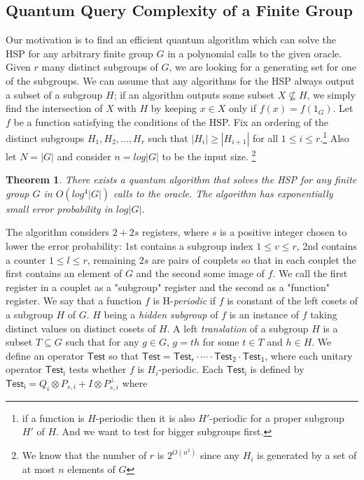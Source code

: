 \documentclass[12pt]{article}
\theoremstyle{plain}
\newtheorem{thm}{Theorem} %
\theoremstyle{definition}
\begin{document}
\subsection{Quantum Query Complexity of a Finite Group}
Our motivation is to find an efficient quantum algorithm which can solve the HSP for any arbitrary finite group $G$ in a polynomial calls to the given oracle. Given $r$ many distinct subgroups of $G$, we are looking for a generating set for one of the subgroups. We can assume that any algorithms for the HSP always output a subset of a subgroup $H$; if an algorithm outputs some subset $X\nsubseteq H$, we simply find the intersection of $X$ with $H$ by keeping $x\in X$ only if $f(x)=f(1_G)$.
\newline
Let $f$ be a function satisfying the conditions of the HSP. Fix an ordering of the distinct subgroups $H_1,H_2,\ldots,H_r$ such that $|H_{i}|\geq|H_{i+1}|$ for all $1\leq i \leq r$.\footnote{
if a function is $H$-periodic then it is also $H'$-periodic for a proper subgroup $H'$ of $H$. And we want to test for bigger subgroups first.}
Also let $N=|G|$ and consider $n=log|G|$ to be the input size. 
\footnote{
We know that the number of $r$ is $2^{O(n^2)}$ since any $H_i$ is generated by a set of at most $n$ elements of $G$}
\begin{thm}\label{thm3}
There exists a quantum algorithm that solves the HSP for any finite group $G$ in $O(log^4|G|)$ calls to the oracle. The algorithm has exponentially small error probability in $log|G|$.
\end{thm}
\noindent The algorithm considers $2+2s$ registers, where $s$ is a positive integer chosen to lower the error probability: 1st contains a subgroup index $1\leq v \leq r$, 2nd contains a counter $1\leq l \leq r$, remaining $2s$ are pairs of couplets so that in each couplet the first contains an element of $G$ and the second some image of $f$. We call the first register in a couplet as a "subgroup" register and the second as a "function" register.
\newline
We say that a function $f$ is H-\emph{periodic} if $f$ is constant of the left cosets of a subgroup $H$ of $G$. $H$ being a \emph{hidden subgroup} of $f$ is an instance of $f$ taking distinct values on distinct cosets of $H$.
\newline
A left \emph{translation} of a subgroup $H$ is a subset $T\subseteq G$ such that for any $g\in G$, $g=th$ for some $t\in T$ and $h\in H$.
\newline
We define an operator ${\mathsf{Test}}$ so that ${\mathsf{Test}}={\mathsf{Test_r}}\cdot\cdots\cdot{\mathsf{Test_2}}\cdot{\mathsf{Test_1}}$, where each unitary operator ${\mathsf{Test_i}}$ tests whether $f$ is $H_i$-periodic. Each ${\mathsf{Test_i}}$ is defined by ${\mathsf{Test_i}}=Q_i\otimes P_{s,i}+I\otimes P^{\perp}_{s,i}$ where
\end{document}
